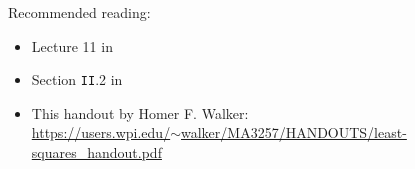 \color{fontcolor}
\begin{frame}
	Recommended reading:	
	\begin{itemize}
		\item Lecture 11 in \cite{TreBau}
		\item Section \texttt{II}.2 in \cite{StrangData}
		\item This handout by Homer F. Walker:\\ \href{https://users.wpi.edu/~walker/MA3257/HANDOUTS/least-squares_handout.pdf}{https://users.wpi.edu/$\sim$walker/MA3257/HANDOUTS/least-squares\_handout.pdf}
	\end{itemize}
	~\\~\\
	
	
\end{frame}

\begin{frame}
~\\
~\\
\end{frame}


